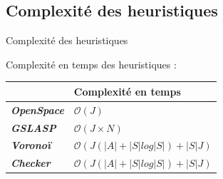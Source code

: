     \subsection*{Complexité des heuristiques}
    \begin{frame}{Complexité des heuristiques}
        \begin{block}{Complexité en temps des heuristiques :}
            \begin{table}[]
                \begin{tabular}{|l|l|}
                \hline
                                            & \textbf{Complexité en temps}               \\ \hline
                \textit{\textbf{OpenSpace}} & $\mathcal{O}(J)$                           \\ \hline
                \textit{\textbf{GSLASP}}    & $\mathcal{O}(J \times N)$                  \\ \hline
                \textit{\textbf{Voronoï}}   & $\mathcal{O}{(J(|A| + |S|log|S|) + |S|J)}$ \\ \hline
                \textit{\textbf{Checker}}   & $\mathcal{O}{(J(|A| + |S|log|S|) + |S|J)}$ \\ \hline
                \end{tabular}
                \end{table}
        \end{block}
    \end{frame}

